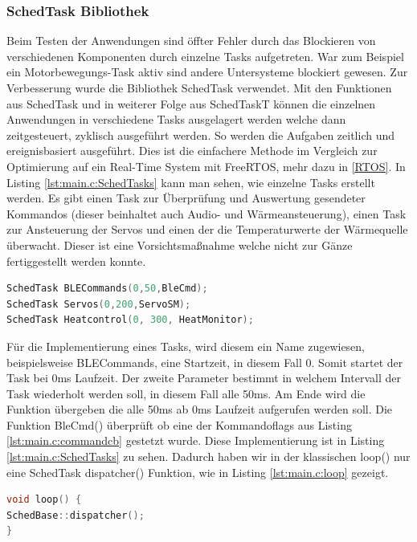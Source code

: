 \subsubsection{SchedTask Bibliothek}
Beim Testen der Anwendungen sind öffter Fehler durch das Blockieren von verschiedenen Komponenten durch einzelne 
Tasks aufgetreten. War zum Beispiel ein Motorbewegungs-Task aktiv sind andere Untersysteme blockiert gewesen. 
Zur Verbesserung wurde die Bibliothek SchedTask verwendet. Mit den Funktionen aus SchedTask und in weiterer Folge
aus SchedTaskT können die einzelnen Anwendungen in verschiedene Tasks ausgelagert werden welche dann zeitgesteuert, zyklisch ausgeführt werden. 
So werden die Aufgaben zeitlich und ereignisbasiert ausgeführt.\cite{schedtask_lib}
Dies ist die einfachere Methode im Vergleich zur Optimierung auf ein Real-Time System mit FreeRTOS,
mehr dazu in \ref{RTOS}. 
In Listing \ref{lst:main.c:SchedTasks} kann man sehen, wie einzelne Tasks erstellt werden. Es gibt 
einen Task zur Überprüfung und Auswertung gesendeter Kommandos (dieser beinhaltet auch Audio- und Wärmeansteuerung),
einen Task zur Ansteuerung der Servos und einen der die Temperaturwerte der Wärmequelle überwacht. Dieser ist eine 
Vorsichtsmaßnahme welche nicht zur Gänze fertiggestellt werden konnte. 
\begin{lstlisting}[language=C++, caption= {Tasks erstellen}, label={lst:main.c:SchedTasks}, firstnumber=184]
SchedTask BLECommands(0,50,BleCmd); 
SchedTask Servos(0,200,ServoSM);
SchedTask Heatcontrol(0, 300, HeatMonitor); 
\end{lstlisting}
\noindent 
Für die Implementierung eines Tasks, wird diesem ein Name zugewiesen, beispielsweise BLECommands,
eine Startzeit, in diesem Fall 0. Somit startet der Task bei 0ms Laufzeit. Der zweite Parameter bestimmt in welchem
Intervall der Task wiederholt werden soll, in diesem Fall alle 50ms. Am Ende wird die Funktion übergeben
die alle 50ms ab 0ms Laufzeit aufgerufen werden soll. Die Funktion BleCmd()
überprüft ob eine der Kommandoflags aus Listing \ref{lst:main.c:commandcb} gestetzt wurde. 
Diese Implementierung ist in Listing \ref{lst:main.c:SchedTasks} zu sehen.
Dadurch haben wir in der klassischen loop() nur eine 
SchedTask dispatcher() Funktion, wie in Listing \ref{lst:main.c:loop} gezeigt. 
\begin{lstlisting}[language=C++, caption= {Loop}, label={lst:main.c:loop}, firstnumber=176]
void loop() {
SchedBase::dispatcher(); 
}
\end{lstlisting}
\noindent

